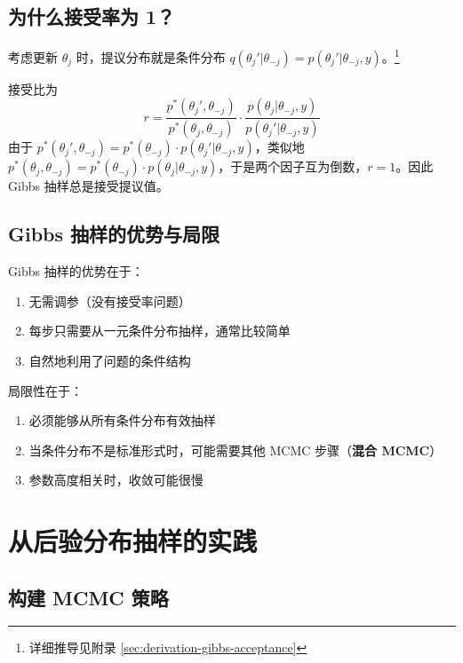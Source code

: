 \subsection{为什么接受率为 1？}

考虑更新 $\theta_j$ 时，提议分布就是条件分布 $q(\theta_j' | \theta_{-j}) = p(\theta_j' | \theta_{-j}, y)$。\footnote{详细推导见附录 \cref{sec:derivation-gibbs-acceptance}}

接受比为
\begin{equation}\label{eq:gibbs-acceptance-ratio}
r = \frac{p^*(\theta_j', \theta_{-j})}{p^*(\theta_j, \theta_{-j})} \cdot \frac{p(\theta_j | \theta_{-j}, y)}{p(\theta_j' | \theta_{-j}, y)}
\end{equation}
由于 $p^*(\theta_j', \theta_{-j}) = p^*(\theta_{-j}) \cdot p(\theta_j' | \theta_{-j}, y)$，类似地 $p^*(\theta_j, \theta_{-j}) = p^*(\theta_{-j}) \cdot p(\theta_j | \theta_{-j}, y)$，于是两个因子互为倒数，$r = 1$。因此 Gibbs 抽样总是接受提议值。

\subsection{Gibbs 抽样的优势与局限}

\begin{Remark}
  Gibbs 抽样的优势在于：
  \begin{enumerate}
    \item 无需调参（没有接受率问题）
    \item 每步只需要从一元条件分布抽样，通常比较简单
    \item 自然地利用了问题的条件结构
  \end{enumerate}

  局限性在于：
  \begin{enumerate}
    \item 必须能够从所有条件分布有效抽样
    \item 当条件分布不是标准形式时，可能需要其他 MCMC 步骤（\textbf{混合 MCMC}）
    \item 参数高度相关时，收敛可能很慢
  \end{enumerate}
\end{Remark}

\section{从后验分布抽样的实践}

\subsection{构建 MCMC 策略}

